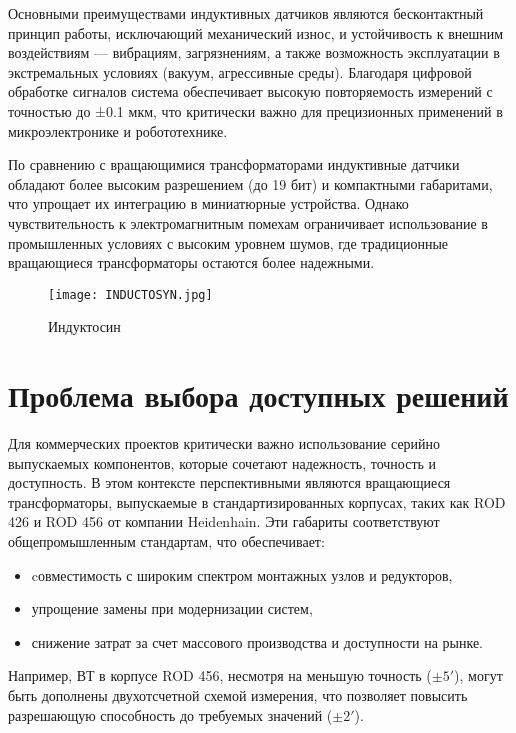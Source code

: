 Основными преимуществами индуктивных датчиков являются бесконтактный принцип работы, исключающий механический износ, и устойчивость к внешним воздействиям — вибрациям, загрязнениям, 
а также возможность эксплуатации в экстремальных условиях (вакуум, агрессивные среды). Благодаря цифровой обработке сигналов система обеспечивает высокую повторяемость измерений 
с точностью до ±0.1 мкм, что критически важно для прецизионных применений в микроэлектронике и робототехнике.

По сравнению с вращающимися трансформаторами индуктивные датчики обладают более высоким разрешением (до 19 бит) и компактными габаритами, что упрощает их интеграцию в миниатюрные устройства. 
Однако  чувствительность к электромагнитным помехам ограничивает использование в промышленных условиях с высоким уровнем шумов, где традиционные вращающиеся трансформаторы 
остаются более надежными.

   \begin{figure}[!ht]
    \centering
    \texttt{[image: INDUCTOSYN.jpg]}
    \caption{Индуктосин}
    \label{Inductosyn}
  \end{figure}

\FloatBarrier
\section{Проблема выбора доступных решений}
Для коммерческих проектов критически важно использование серийно выпускаемых компонентов, которые сочетают надежность, точность и доступность. 
В этом контексте перспективными являются вращающиеся трансформаторы, выпускаемые в стандартизированных корпусах, таких как ROD 426 и ROD 456 от компании Heidenhain. 
Эти габариты соответствуют общепромышленным стандартам, что обеспечивает:

\begin{itemize} 
  \item cовместимость с широким спектром монтажных узлов и редукторов,
  \item упрощение замены при модернизации систем,
  \item снижение затрат за счет массового производства и доступности на рынке.
\end{itemize}

Например, ВТ в корпусе ROD 456, несмотря на меньшую точность ($ \pm 5'$), могут быть дополнены двухотсчетной схемой измерения, 
что позволяет повысить разрешающую способность до требуемых значений ($ \pm 2'$).
 \FloatBarrier

